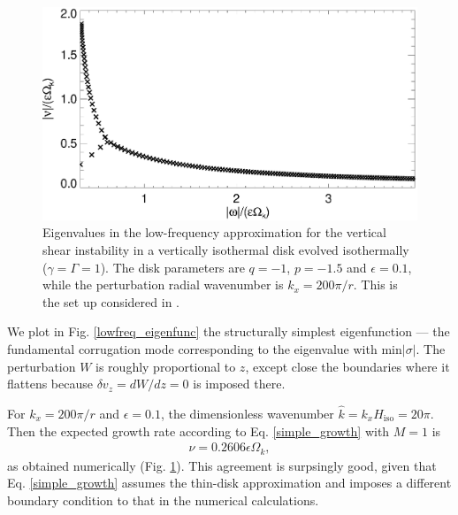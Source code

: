 \begin{figure}
  \includegraphics[width=\linewidth]{figures/eigenvalues_iso}
  \caption{Eigenvalues in the low-frequency approximation for the
    vertical shear instability in a vertically isothermal disk evolved
    isothermally ($\gamma=\Gamma=1$). The disk parameters are $q=-1$,
    $p=-1.5$ and $\epsilon=0.1$, while the perturbation radial
    wavenumber is $k_x=200\pi/r$. This is the set up considered in
    \cite{mcnally14}. \label{lowfreq_eigen}
  }
\end{figure}

We plot in Fig. \ref{lowfreq_eigenfunc} the structurally simplest
eigenfunction --- the fundamental corrugation mode corresponding to
the eigenvalue with $\mathrm{min}|\sigma|$. The perturbation $W$ is
roughly proportional to $z$, except close the boundaries where it
flattens because $\delta v_z=dW/dz=0$ is imposed there. 

For $k_x = 200\pi/r$ and $\epsilon = 0.1$, the dimensionless
wavenumber $\hat{k} = k_xH_\mathrm{iso}=20\pi$. Then the expected
growth rate according to Eq. \ref{simple_growth} with $M=1$ is
\begin{align*}
  \nu = 0.2606\epsilon\Omega_k,
\end{align*}
as obtained numerically (Fig. \ref{lowfreq_eigen}). This agreement is
surpsingly good, given that Eq. \ref{simple_growth} assumes the
thin-disk approximation and imposes a different boundary condition to
that in the numerical calculations. 


